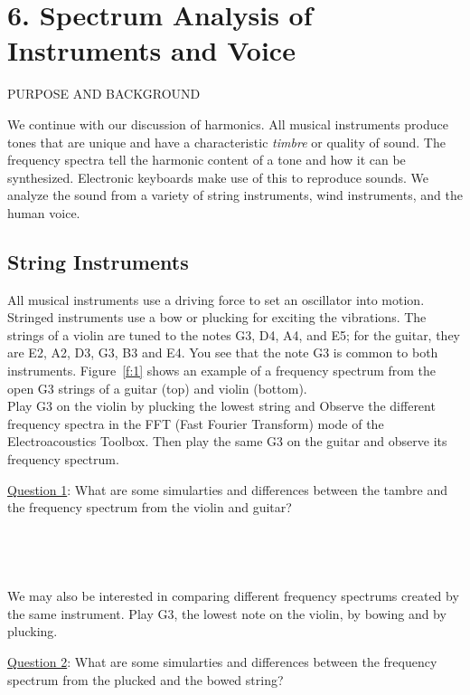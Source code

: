 \documentclass[11pt]{NSF}
\begin{document}
\section{6. Spectrum Analysis of Instruments and Voice}

PURPOSE AND BACKGROUND

We continue with our discussion of harmonics. 
All musical instruments produce tones that
are unique and have a characteristic {\em timbre} or quality of sound. The
frequency spectra tell the harmonic content of a tone and how it can
be synthesized. Electronic keyboards make use of this to reproduce
sounds. We analyze the sound from a variety of string instruments, 
wind instruments, and the human voice.

\subsection{String Instruments}

All musical instruments use a driving force to set an oscillator into
motion. Stringed instruments use a bow or plucking for exciting the
vibrations. 
The strings of a violin are tuned to the notes G3, D4, A4, and E5;
for the guitar, they are E2, A2, D3, G3, B3 and E4. You see that the
note G3 is common to both instruments. 
Figure~\ref{f:1} shows an example of a frequency spectrum from the 
open G3 strings of a guitar (top) and violin (bottom). \\

Play G3 on the violin by plucking the lowest string and Observe the different frequency
spectra in the FFT (Fast Fourier Transform) mode of the Electroacoustics Toolbox.
Then play the same G3 on the guitar and observe its frequency spectrum. 

\underline{Question 1}: 
What are some simularties and differences between the tambre and the frequency spectrum from the violin and guitar? 
\\
\\
\\
\\
\\

We may also be interested in comparing different frequency spectrums created by the same instrument.
Play G3, the lowest note on the violin, by bowing and by plucking. 

\underline{Question 2}: 
What are some simularties and differences between the frequency spectrum from the plucked and the bowed string?
\\
\\
\\
\\
\\
\end{document}
